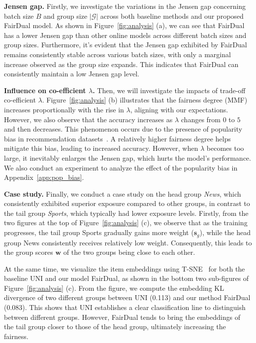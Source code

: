 \textbf{Jensen gap.} Firstly, we investigate the variations in the Jensen gap concerning batch size $B$ and group size $|\mathcal{G}|$ across both baseline methods and our proposed FairDual model. As shown in Figure~\ref{fig:analysis} (a), we can see that FairDual has a lower Jensen gap than other online models across different batch sizes and group sizes. Furthermore, it's evident that the Jensen gap exhibited by FairDual remains consistently stable across various batch sizes, with only a marginal increase observed as the group size expands. This indicates that FairDual can consistently maintain a low Jensen gap level.


\textbf{Influence on co-efficient $\lambda$.} Then, we will investigate the impacts of trade-off co-efficient $\lambda$. Figure~\ref{fig:analysis} (b) illustrates that the fairness degree (MMF) increases proportionally with the rise in $\lambda$, aligning with our expectations. However, we also observe that the accuracy increases as $\lambda$ changes from $0$ to $5$ and then decreases. This phenomenon occurs due to the presence of popularity bias in recommendation datasets~\citep{jiang2024itemside}. A relatively higher fairness degree helps mitigate this bias, leading to increased accuracy. However, when $\lambda$ becomes too large, it inevitably enlarges the Jensen gap, which hurts the model's performance. We also conduct an experiment to analyze the effect of the popularity bias in Appendix~\ref{app:pop_bias}.


\textbf{Case study.} Finally, we conduct a case study on the head group \textit{News}, which consistently exhibited superior exposure compared to other groups, in contrast to the tail group \textit{Sports}, which typically had lower exposure levels. Firstly, from the two figures at the top of Figure~\ref{fig:analysis} (c), we observe that as the training progresses, the tail group Sports gradually gains more weight ($\bm{s}_g$), while the head group News consistently receives relatively low weight. Consequently, this leads to the group scores $\bm{w}$ of the two groups being close to each other. 

At the same time, we visualize the item embeddings using T-SNE~\citep{van2008visualizing} for both the baseline UNI and our model FairDual, as shown in the bottom two sub-figures of Figure~\ref{fig:analysis} (c). From the figure, we compute the embedding KL divergence of two different groups between UNI (0.113) and our method FairDual (0.083). This shows that UNI establishes a clear classification line to distinguish between different groups. However, FairDual tends to bring the embeddings of the tail group closer to those of the head group, ultimately increasing the fairness.

